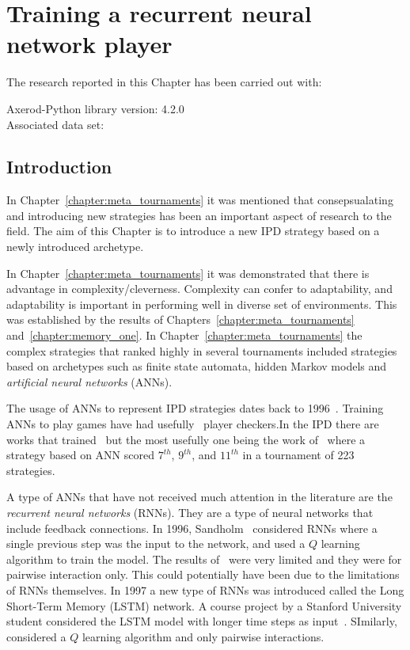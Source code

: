 \chapter{Training a recurrent neural network player}\label{chapter:lstm}

\begin{center}
    The research reported in this Chapter has been carried out with:

    Axerod-Python library version: 4.2.0 \\
    Associated data set: \\ \vspace{.5cm} %
\end{center}

\hrulefill

\section{Introduction}

In Chapter~\ref{chapter:meta_tournaments} it was mentioned that consepsualating
and introducing new strategies has been an important aspect of research to the
field. The aim of this Chapter is to introduce a new IPD strategy based on a
newly introduced archetype.

In Chapter~\ref{chapter:meta_tournaments} it was demonstrated that there is
advantage in complexity/cleverness. Complexity can confer to adaptability, and
adaptability is important in performing well in diverse set of environments.
This was established by the results of Chapters~\ref{chapter:meta_tournaments}
and~\ref{chapter:memory_one}. In Chapter~\ref{chapter:meta_tournaments} the
complex strategies that ranked highly in several tournaments included strategies
based on archetypes such as finite state automata, hidden Markov models and
\textit{artificial neural networks} (ANNs).

The usage of ANNs to represent IPD strategies dates back to
1996~\cite{Harrald1996}. Training ANNs to play games have had
usefully~\cite{Chellapilla1999} player checkers.In the IPD there are works that
trained~\cite{Franken2005} but the most usefully one being the work
of~\cite{Harper2017} where a strategy based on ANN scored \(7^{th}\),
\(9^{th}\), and \(11^{th}\) in a tournament of 223 strategies.

A type of ANNs that have not received much attention in the literature are the
\textit{recurrent neural networks} (RNNs). They are a type of neural networks
that include feedback connections. In 1996, Sandholm~\cite{Sandholm1996}
considered RNNs where a single previous step was the input to the network, and
used a \(Q\) learning algorithm to train the model. The results
of~\cite{Sandholm1996} were very limited and they were for pairwise interaction
only. This could potentially have been due to the limitations of RNNs
themselves. In 1997 a new type of RNNs was introduced called the  Long
Short-Term Memory (LSTM) network. A course project by a Stanford University
student considered the LSTM model with longer time steps as
input~\cite{Wang20170}. SImilarly,~\cite{Wang20170} considered a \(Q\) learning
algorithm and only pairwise interactions.

